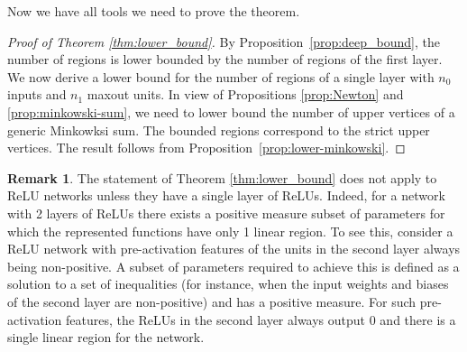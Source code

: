 \documentclass{article}
\newtheorem{proposition}[theorem]{Proposition}
\theoremstyle{definition}
\newtheorem{remark}[theorem]{Remark}
\newcommand{\nin}{n_0}
\begin{document}
Now we have all tools we need to prove the theorem. 

\begin{proof}[Proof of Theorem \ref{thm:lower_bound}]
By Proposition~\ref{prop:deep_bound}, the number of regions is lower bounded by the number of regions of the first layer.
We now derive a lower bound for the number of regions of a single layer with $\nin$ inputs and $n_1$ maxout units. 
In view of Propositions \ref{prop:Newton} and \ref{prop:minkowski-sum}, we need to lower bound the number of upper vertices of a generic Minkowksi sum. 
The bounded regions correspond to the strict upper vertices. 
The result follows from Proposition~\ref{prop:lower-minkowski}.
\end{proof}

\begin{remark}
\label{remark:lower_bound_relu}
    The statement of Theorem \ref{thm:lower_bound} does not apply to ReLU networks unless they have a single layer of ReLUs. Indeed, for a network with 2 layers of ReLUs there exists a positive measure subset of parameters for which the represented functions have only 1 linear region. 
    To see this, consider a ReLU network with pre-activation features of the units in the second layer always being non-positive. 
    A subset of parameters required to achieve this is defined as a solution to a set of inequalities (for instance, when the input weights and biases of the second layer are non-positive) and has a positive measure. 
    For such pre-activation features, the ReLUs in the second layer always output $0$  and there is a single linear region for the network. 
\end{remark}

\begin{comment}
\begin{proposition}
    The number of regions of a maxout network is lower bounded with
    \begin{align*}
        2^{\nin - 1}(n_1 - \nin + 1). 
    \end{align*}
\end{proposition}

\begin{proof}
    For $n_1 \geq \nin + 2$, Use a lower bound on the number of $\nin$-cells of a hyperplane arrangement (by McMullen(?), mentioned in \citet{canham1972arrangements}, but can't be read, (also mentioned in \citet{shannon1976lower}, Theorem 3). It seems that a more recent work is by \citet{karavelas2011tight}, but this requires checking).
\end{proof}
\end{comment}
\end{document}

